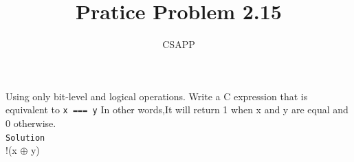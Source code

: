 \documentclass{article}
\title{Pratice Problem 2.15}
\author{CSAPP}
\begin{document}
    \maketitle

    \begin{flushleft}
        Using only bit-level and logical operations. 
        Write a C expression that is equivalent to \texttt{x === y}
        In other words,It will return 1 when x and y are equal and 0
        otherwise.\\
        \texttt{Solution}\\
        !(x $\oplus$ y)
    \end{flushleft}
\end{document}
